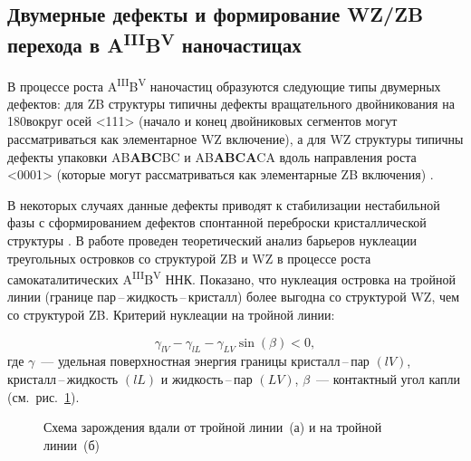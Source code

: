\subsection{Двумерные дефекты и формирование WZ/ZB перехода в
A\textsuperscript{III}B\textsuperscript{V}
наночастицах}\label{subsec:ch1/sec2/sub5}

В процессе роста A\textsuperscript{III}B\textsuperscript{V} наночастиц
образуются следующие типы двумерных дефектов:  для ZB структуры типичны дефекты
вращательного двойникования на 180\textdegree вокруг осей <111> (начало и конец
двойниковых сегментов могут рассматриваться как элементарное WZ включение), а
для WZ структуры типичны дефекты упаковки AB\textbf{ABC}BC и AB\textbf{ABCA}CA
вдоль направления роста <0001> (которые могут рассматриваться как элементарные
ZB включения) \cite{knoll2014}.

В некоторых случаях данные дефекты приводят к стабилизации нестабильной фазы с
сформированием дефектов спонтанной переброски кристаллической структуры
\cite{Cirlin2010}. В работе \cite{Glas2007} проведен теоретический анализ
барьеров нуклеации треугольных островков со структурой ZB и WZ в процессе роста
самокаталитических A\textsuperscript{III}B\textsuperscript{V} ННК. Показано,
что нуклеация островка на тройной линии (границе
пар\,--\,жидкость\,--\,кристалл) более выгодна со структурой WZ, чем со
структурой ZB. Критерий нуклеации на тройной линии:

\begin{equation} \label{eq:eq_1} \gamma_{lV} - \gamma_{lL} - \gamma_{LV}
\sin(\beta) < 0, \end{equation} где \(\gamma\)~--- удельная поверхностная
энергия границы кристалл\,--\,пар \((lV)\), кристалл\,--\,жидкость \((lL)\) и
жидкость\,--\,пар \((LV)\), \(\beta\)~--- контактный угол капли
(см.~рис.~\cref{fig:Image_7}).

\begin{figure}[ht]   \caption{Схема зарождения вдали от тройной линии~(а) и
на тройной линии~(б) \cite{Glas2007}}\label{fig:Image_7} \end{figure}

